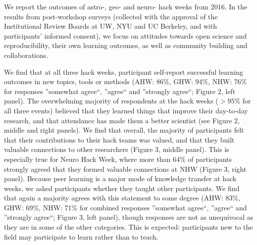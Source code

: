 We report the outcomes of astro-, geo- and neuro- hack weeks from 2016. In the results from post-workshop surveys (collected with the approval of the Institutional Review Boards at UW, NYU and UC Berkeley, and with participants' informed consent), we focus on attitudes towards open science and reproducibility, their own learning outcomes, as well as community building and collaborations.

We find that at all three hack weeks, participant self-report successful learning outcomes in new topics, tools or methods (AHW: 86\%, GHW: 94\%, NHW: 76\% for responses ''somewhat agree``, ''agree`` and ''strongly agree``; Figure 2, left panel).
The overwhelming majority of respondents at the hack weeks ($>95\%$ for all three events) believed that they learned things that improve their day-to-day research, and that attendance has made them a better scientist (see Figure 2, middle and right panels).
We find that overall, the majority of participants felt that their contributions to their hack teams was valued, and that they built valuable connections to other researchers (Figure 3, middle panel).
This is especially true for Neuro Hack Week, where more than 64\% of participants strongly agreed that they formed valuable connections at NHW (Figure 3, right panel).
Because peer learning is a major mode of knowledge transfer at hack weeks, we asked participants whether they taught other participants.
We find that again a majority agrees with this statement to some degree (AHW: 83\%, GHW: 69\%, NHW: 71\% for combined responses ''somewhat agree``, ''agree`` and ''strongly agree``; Figure 3, left panel), though responses are not as unequivocal as they are in some of the other categories.
This is expected: participants new to the field may participate to learn rather than to teach.

